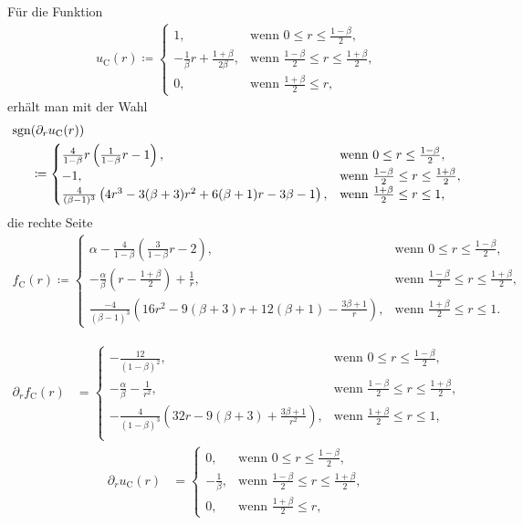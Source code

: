 Für die Funktion
\begin{align*}
  u_\textrm{C}(r)\coloneqq 
  \begin{cases}
    1, & \text{wenn } 0\leq r\leq\frac{1-\beta}{2},\\
    -\frac{1}{\beta}r + \frac{1+\beta}{2\beta}, & 
    \text{wenn } \frac{1-\beta}{2}\leq r\leq \frac{1+\beta}{2},\\
    0, & \text{wenn } \frac{1+\beta}{2}\leq r,
  \end{cases}
\end{align*}
erhält man mit der Wahl
\begin{align*}
  \operatorname{sgn}&(\partial_r u_\textrm{C}(r)) \\
  &\coloneqq 
  \begin{cases}
    \frac{4}{1-\beta}r\left(\frac{1}{1-\beta}r -1\right), &
    \text{wenn } 0\leq r\leq\frac{1-\beta}{2},\\
    -1, & \text{wenn } \frac{1-\beta}{2}\leq r\leq \frac{1+\beta}{2},\\
    \frac{4}{(\beta-1)^3}
    \left( 4r^3-3(\beta+3)r^2 +6(\beta+1)r-3\beta-1\right), & 
    \text{wenn } \frac{1+\beta}{2}\leq r\leq 1,
  \end{cases}
\end{align*}
die rechte Seite
\begin{align*}
  f_\textrm{C}(r)\coloneqq 
  \begin{cases}
    \alpha - \frac{4}{1-\beta}\left(\frac{3}{1-\beta}r - 2\right), &
    \text{wenn } 0\leq r\leq\frac{1-\beta}{2},\\
    -\frac{\alpha}{\beta}\left( r-\frac{1+\beta}{2} \right) +\frac{1}{r}, & 
    \text{wenn } \frac{1-\beta}{2}\leq r\leq \frac{1+\beta}{2},\\
    \frac{-4}{(\beta-1)^3}
    \left( 16r^2 -9(\beta+3)r + 12(\beta+1) - \frac{3\beta+1}{r}\right), & 
    \text{wenn } \frac{1+\beta}{2}\leq r\leq 1.
  \end{cases}
\end{align*}

\begin{align*}
  \partial_r f_\textrm{C}(r) &= 
  \begin{cases}
    -\frac{12}{(1-\beta)^2},&\text{wenn }0\leq r\leq\frac{1-\beta}{2},\\
    -\frac{\alpha}{\beta}-\frac{1}{r^2},&
    \text{wenn } \frac{1-\beta}{2}\leq r\leq \frac{1+\beta}{2},\\
    -\frac{4}{(1-\beta)^3}\left( 32r-9(\beta+3)+\frac{3\beta+1}{r^2} \right),&
    \text{wenn } \frac{1+\beta}{2}\leq r\leq 1,\\
  \end{cases}
\end{align*}
\begin{align*}
  \partial_r u_\textrm{C}(r) &= 
  \begin{cases}
    0,&\text{wenn }0\leq r\leq\frac{1-\beta}{2},\\
    -\frac{1}{\beta},&
    \text{wenn } \frac{1-\beta}{2}\leq r\leq \frac{1+\beta}{2},\\
    0,&\text{wenn } \frac{1+\beta}{2}\leq r,
  \end{cases}
\end{align*}

